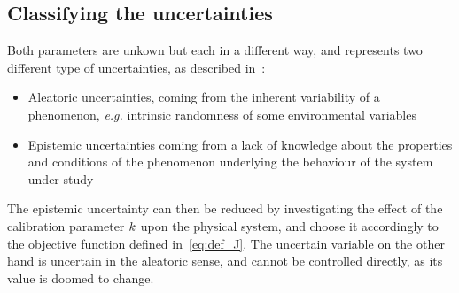 \documentclass[../../Main_ManuscritThese.tex]{subfiles}
\begin{document}
\subsection{Classifying the uncertainties}
Both parameters are unkown but each in a different way, and represents two different type of uncertainties, as described in~\cite{walker_defining_2003}:
\begin{itemize}
\item Aleatoric uncertainties, coming from the inherent variability of a phenomenon, \emph{e.g.} intrinsic randomness of some environmental variables
\item Epistemic uncertainties coming from a lack of knowledge about the properties and conditions of the phenomenon underlying the behaviour of the system under study
\end{itemize}
The epistemic uncertainty can then be reduced by investigating the effect of the calibration parameter $k$ upon the physical system, and choose it accordingly to the objective function defined in~\cref{eq:def_J}.
The uncertain variable on the other hand is uncertain in the aleatoric sense, and cannot be controlled directly, as its value is doomed to change.
\end{document}
